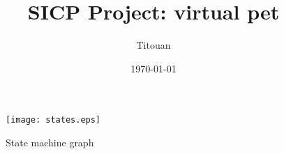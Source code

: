 \documentclass[a4paper]{article}
\author{Titouan \bsc{Christophe}}
\date{\today}
\title{SICP Project: virtual pet}
\begin{document}
\maketitle
\begin{figure}[h]
  \texttt{[image: states.eps]}
  \caption{\label{fig:states} State machine graph}
\end{figure}
\end{document}
